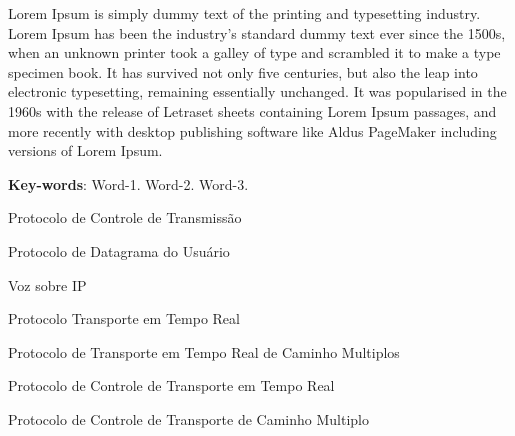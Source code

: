 \documentclass[
	12pt,				%
	openright,			%
	oneside,			%
	a4paper,			%
	chapter=TITLE,		%
	english,			%
	brazil,				%
	]{abntex2}
\begin{document}
\begin{resumo}[Abstract]
\ABNTEXchapterfont
Lorem Ipsum is simply dummy text of the printing and typesetting industry. Lorem Ipsum has been the industry's standard dummy text ever since the 1500s, when an unknown printer took a galley of type and scrambled it to make a type specimen book. It has survived not only five centuries, but also the leap into electronic typesetting, remaining essentially unchanged. It was popularised in the 1960s with the release of Letraset sheets containing Lorem Ipsum passages, and more recently with desktop publishing software like Aldus PageMaker including versions of Lorem Ipsum.


\textbf{Key-words}: Word-1. Word-2. Word-3.
\end{resumo}


\listoffigures*
\cleardoublepage


\listoftables*
\cleardoublepage


\begin{siglas}
\ABNTEXchapterfont\item[TCP] Protocolo de Controle de Transmissão
\item[UDP] Protocolo de Datagrama do Usuário 
\item[VoIP] Voz sobre IP 
\item[RTP] Protocolo Transporte em Tempo Real
\item[MPRTP] Protocolo de Transporte em Tempo Real de Caminho Multiplos \item[RTCP] Protocolo de Controle de Transporte em Tempo Real
\item[MPTCP] Protocolo de Controle de Transporte de Caminho Multiplo 
\end{siglas}
\tableofcontents*
\cleardoublepage
\textual
\end{document}
